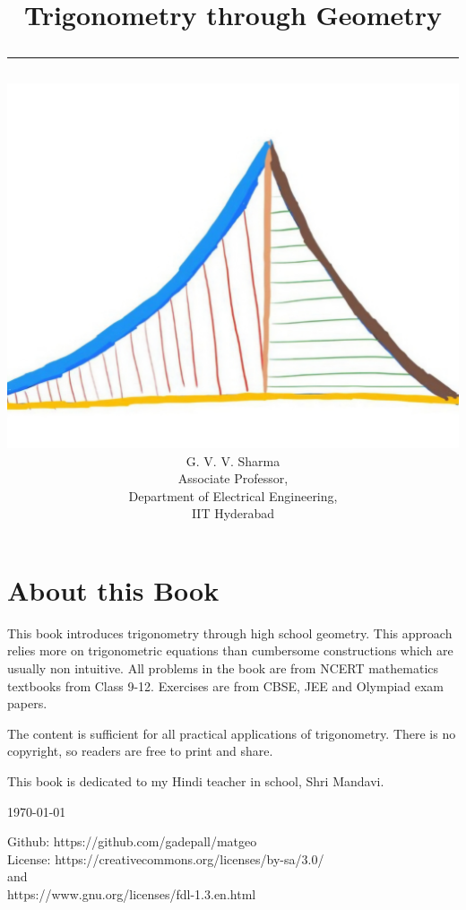 \documentclass[journal]{IEEEtran}
\begin{document}

\onecolumn


\title{
	\begin{center}
	Trigonometry through Geometry
	\\
\rule{0.4\columnwidth}{0.4pt}
\end{center}
}
\author{
\vspace{11cm}
	\begin{center}
\includegraphics[width=0.2\columnwidth]{figs/logo.jpg}
\\
		{\huge	G. V. V. Sharma}\\Associate Professor,\\Department of Electrical Engineering, \\ IIT Hyderabad
	\end{center}
}
\maketitle

\newpage
\section*{About this Book}

This book introduces trigonometry through high school geometry. This approach relies more on trigonometric equations than cumbersome constructions which are usually non intuitive.
 All problems in the book are from NCERT mathematics textbooks from Class 9-12.  Exercises are from CBSE, JEE and Olympiad exam papers.   

The content is sufficient for all practical applications of trigonometry.
There is no copyright, so readers are free to print and share.  

This book is dedicated to my Hindi teacher in school, Shri Mandavi.
\begin{flushright}
\today
\end{flushright}
Github: https://github.com/gadepall/matgeo
		\\
License: https://creativecommons.org/licenses/by-sa/3.0/
\\
and
\\
https://www.gnu.org/licenses/fdl-1.3.en.html
\end{document}
